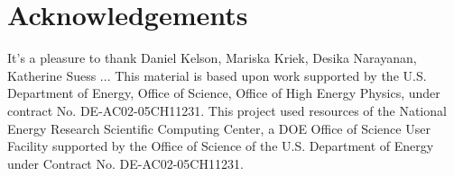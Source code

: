 \documentclass[12pt, letterpaper, preprint]{aastex62}
\begin{document}


 
%
%



\section*{Acknowledgements}
It's a pleasure to thank
    Daniel Kelson, 
    Mariska Kriek, 
    Desika Narayanan,
    Katherine Suess 
    ...
This material is based upon work supported by the U.S. Department of Energy,
Office of Science, Office of High Energy Physics, under contract No.
DE-AC02-05CH11231.  This project used resources of the National Energy Research
Scientific Computing Center, a DOE Office of Science User Facility supported by
the Office of Science of the U.S.  Department of Energy under Contract No.
DE-AC02-05CH11231. 

\appendix
 
 


 
\end{document}
